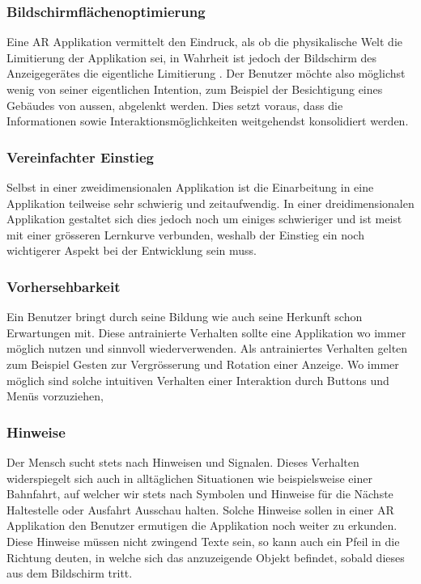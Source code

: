\documentclass[a4paper]{scrreprt}
\begin{document}
\subsubsection{Bildschirmflächenoptimierung}
Eine AR Applikation vermittelt den Eindruck, als ob die physikalische Welt die Limitierung der Applikation sei, in Wahrheit ist jedoch der Bildschirm des Anzeigegerätes die eigentliche Limitierung .
Der Benutzer möchte also möglichst wenig von seiner eigentlichen Intention, zum Beispiel der Besichtigung eines Gebäudes von aussen, abgelenkt werden. Dies setzt voraus, dass die Informationen sowie Interaktionsmöglichkeiten weitgehendst konsolidiert werden.

\subsubsection{Vereinfachter Einstieg}
Selbst in einer zweidimensionalen Applikation ist die Einarbeitung in eine Applikation teilweise sehr schwierig und zeitaufwendig. In einer dreidimensionalen Applikation gestaltet sich dies jedoch noch um einiges schwieriger und ist meist mit einer grösseren Lernkurve verbunden, weshalb der Einstieg ein noch wichtigerer Aspekt bei der Entwicklung sein muss.

\subsubsection{Vorhersehbarkeit}
Ein Benutzer bringt durch seine Bildung wie auch seine Herkunft schon Erwartungen mit. Diese antrainierte Verhalten sollte eine Applikation wo immer möglich nutzen und sinnvoll wiederverwenden. Als antrainiertes Verhalten gelten zum Beispiel Gesten zur Vergrösserung und Rotation einer Anzeige. Wo immer möglich sind solche intuitiven Verhalten einer Interaktion durch Buttons und Menüs vorzuziehen,

\subsubsection{Hinweise}
Der Mensch sucht stets nach Hinweisen und Signalen. Dieses Verhalten widerspiegelt sich auch in alltäglichen Situationen wie beispielsweise einer Bahnfahrt, auf welcher wir stets nach Symbolen und Hinweise für die Nächste Haltestelle oder Ausfahrt Ausschau halten.
Solche Hinweise sollen in einer AR Applikation den Benutzer ermutigen die Applikation noch weiter zu erkunden.
Diese Hinweise müssen nicht zwingend Texte sein, so kann auch ein Pfeil in die Richtung deuten, in welche sich das anzuzeigende Objekt befindet, sobald dieses aus dem Bildschirm tritt.
\end{document}
